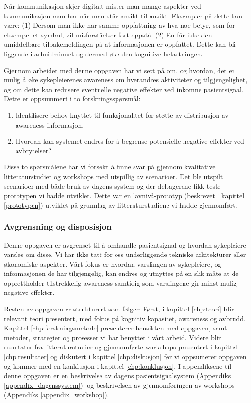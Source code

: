 Når kommunikasjon skjer digitalt mister man mange aspekter ved kommunikasjon man har når man står ansikt-til-ansikt. Eksempler på dette kan være: (1) Dersom man ikke har samme oppfattning av hva noe betyr, som for eksempel et symbol, vil misforståelser fort oppstå. (2) En får ikke den umiddelbare tilbakemeldingen på at informasjonen er oppfattet. Dette kan bli liggende i arbeidminnet og dermed øke den kognitive belastningen. 


\noindent
Gjennom arbeidet med denne oppgaven har vi sett på om, og hvordan, det er mulig å øke sykepleierenes awareness om hverandres aktiviteter og tilgjengelighet, og om dette kan redusere eventuelle negative effekter ved inkomne pasientsignal. Dette er oppsummert i to forskningsspørsmål:

\begin{enumerate}
  \item Identifisere behov knyttet til funksjonalitet for støtte av distribusjon av awareness-informasjon.
  \item Hvordan kan systemet endres for å begrense potensielle negative effekter ved avbrytelser?
\end{enumerate}

\noindent
Disse to spørsmålene har vi forsøkt å finne svar på gjennom kvalitative litteraturstudier og workshops med utspillig av scenarioer. Det ble utspilt scenarioer med både bruk av dagens system og der deltagerene fikk teste prototypen vi hadde utviklet. Dette var en lavnivå-prototyp (beskrevet i kapittel \ref{prototypen}) utviklet på grunnlag av litteraturstudiene vi hadde gjennomført.

\subsubsection{Avgrensning og disposisjon}
Denne oppgaven er avgrenset til å omhandle pasientsignal og hvordan sykepleiere varsles om disse. Vi har ikke tatt for oss underliggende tekniske arkitekturer eller økonomiske aspekter. Vårt fokus er hvordan varslingen av sykepleiere, og informasjonen de har tilgjengelig, kan endres og utnyttes på en slik måte at de opprettholder tilstrekkelig awareness samtidig som varslingene gir minst mulig negative effekter.

\noindent
Resten av oppgaven er strukturert som følger: Først, i kapittel \ref{chp:teori} blir relevant teori presentert, med fokus på kognitiv kapasitet, awareness og avbrudd. Kapittel \ref{chp:forskningsmetode} presenterer hensikten med oppgaven, samt metoder, strategier og prosesser vi har benyttet i vårt arbeid. Videre blir resultater fra litteraturstudier og gjennomførte workshops presentert i kapittel \ref{chp:resultater} og diskutert i kapittel \ref{chp:diskusjon} før vi oppsumerer oppgaven og kommer med en konklusjon i kapittel \ref{chp:konklusjon}. I appendiksene til denne oppgaven er en beskrivelse av dagens pasientsignalsystem (Appendiks \ref{appendix_dagenssystem}), og beskrivelsen av gjennomføringen av workshops (Appendiks \ref{appendix_workshop}).